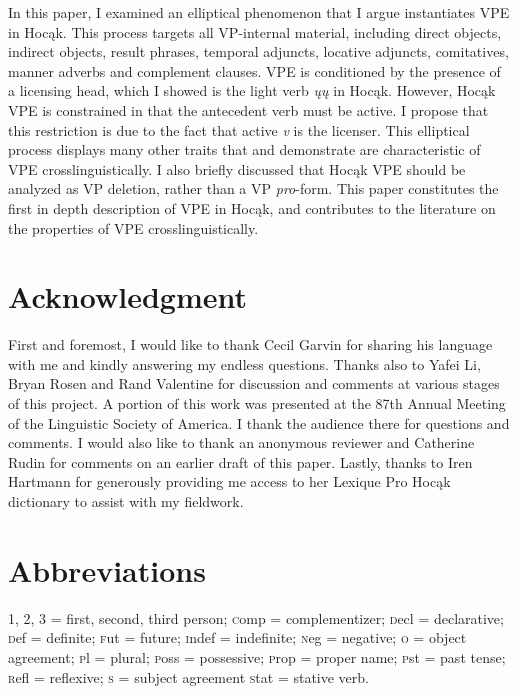 \documentclass[output=paper]{LSP/langsci}
\begin{document}
In this paper, I examined an elliptical phenomenon that I argue instantiates VPE in Hocąk. This process targets all VP-internal material, including direct objects, indirect objects, result phrases, temporal adjuncts, locative adjuncts, comitatives, manner adverbs and complement clauses. VPE is conditioned by the presence of a licensing head, which I showed is the light verb \emph{ųų} in Hocąk. However, Hocąk VPE is constrained in that the antecedent verb must be active. I propose that this restriction is due to the fact that active \emph{v} is the licenser. This elliptical process displays many other traits that \citet{Goldberg2005} and \citet{Fortin2007} demonstrate are characteristic of VPE crosslinguistically. I also briefly discussed that Hocąk VPE should be analyzed as VP deletion, rather than a VP \emph{pro}-form. This paper constitutes the first in depth description of VPE in Hocąk, and contributes to the literature on the properties of VPE crosslinguistically. 

\section*{Acknowledgment}

First and foremost, I would like to thank Cecil Garvin for sharing his language with me and kindly answering my endless questions. Thanks also to Yafei Li, Bryan Rosen and Rand Valentine for discussion and comments at various stages of this project. A portion of this work was presented at the 87th Annual Meeting of the Linguistic Society of America. I thank the audience there for questions and comments. I would also like to thank an anonymous reviewer and Catherine Rudin for comments on an earlier draft of this paper. Lastly, thanks to Iren Hartmann for generously providing me access to her Lexique Pro Hocąk dictionary to assist with my fieldwork.

\section*{Abbreviations}
1, 2, 3 = first, second, third person; {\textsc comp} = complementizer; {\textsc decl} = declarative; {\textsc def} = definite; {\textsc fut} = future; {\textsc indef} = indefinite; {\textsc neg} = negative; {\textsc o} = object agreement; {\textsc pl} = plural; {\textsc poss} = possessive; {\textsc prop} = proper name; {\textsc pst} = past tense; {\textsc refl} = reflexive; {\textsc s} = subject agreement {\textsc stat} = stative verb.
\end{document}
